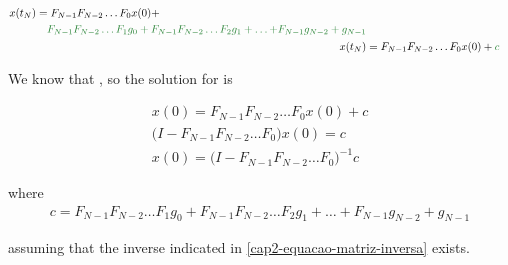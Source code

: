 \begin{align}
    \begin{split}
        x(t_N) &= F_{N-1}F_{N-2} \ldots F_0 x(0) + \\
        &\quad \green{F_{N-1}F_{N-2} \ldots F_1 g_0 + F_{N-1}F_{N-2} \ldots F_2 g_1 + \ldots +} \green{F_{N-1} g_{N-2} + g_{N-1}}
    \end{split} \nonumber \\
    x(t_N) &= F_{N-1} F_{N-2}\ldots F_0 x(0) + \green{c}
\end{align}

We know that , so the solution for  is

\noindent
\begin{align}
    x(0) = F_{N-1}F_{N-2} \ldots F_0 x(0) + c \nonumber \\
    \Big(I - F_{N-1}F_{N-2} \ldots F_0\Big) x(0) = c \nonumber \\
    x(0) = \Big(I - F_{N-1}F_{N-2} \ldots F_0\Big)^{-1} c
    \label{cap2-equacao-matriz-inversa}
\end{align}

\noindent
where
\begin{equation}
    \begin{split}
        c = F_{N-1}F_{N-2} \ldots F_1 g_0 + F_{N-1}F_{N-2} \ldots F_2 g_1 + \ldots + F_{N-1} g_{N-2} + g_{N-1}
    \end{split}
\end{equation}

\noindent
assuming that the inverse indicated in \eqref{cap2-equacao-matriz-inversa} exists.